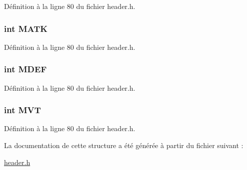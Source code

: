 Définition à la ligne 80 du fichier header.\-h.

\hypertarget{structt__stats_ae183b98dc9aca9905f531bfd4dd51a1c}{
\subsubsection[{M\-A\-T\-K}]{\setlength{\rightskip}{0pt plus 5cm}int M\-A\-T\-K}}\label{structt__stats_ae183b98dc9aca9905f531bfd4dd51a1c}


Définition à la ligne 80 du fichier header.\-h.

\hypertarget{structt__stats_a92ab6d75a95ed209b7875314f53fb555}{
\subsubsection[{M\-D\-E\-F}]{\setlength{\rightskip}{0pt plus 5cm}int M\-D\-E\-F}}\label{structt__stats_a92ab6d75a95ed209b7875314f53fb555}


Définition à la ligne 80 du fichier header.\-h.

\hypertarget{structt__stats_a397f7940443939415a50f324dc5f56f9}{
\subsubsection[{M\-V\-T}]{\setlength{\rightskip}{0pt plus 5cm}int M\-V\-T}}\label{structt__stats_a397f7940443939415a50f324dc5f56f9}


Définition à la ligne 80 du fichier header.\-h.



La documentation de cette structure a été générée à partir du fichier suivant \-:\begin{DoxyCompactItemize}
\item 
\hyperlink{header_8h}{header.\-h}\end{DoxyCompactItemize}
